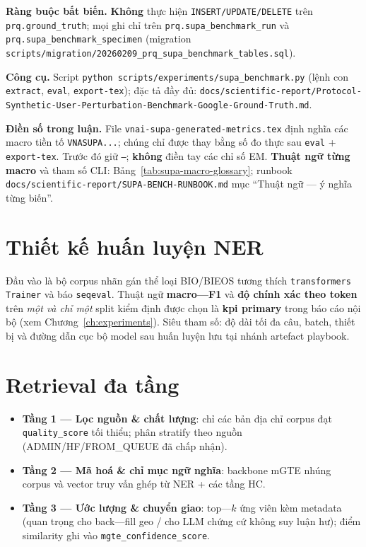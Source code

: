 \textbf{Ràng buộc bất biến.} \textbf{Không} thực hiện \texttt{INSERT/UPDATE/DELETE} trên \texttt{prq.ground\_truth}; mọi ghi chỉ trên \texttt{prq.supa\_benchmark\_run} và \texttt{prq.supa\_benchmark\_specimen} (migration \texttt{scripts/migration/20260209\_prq\_supa\_benchmark\_tables.sql}).

\textbf{Công cụ.} Script \texttt{python scripts/experiments/supa\_benchmark.py} (lệnh con \texttt{extract}, \texttt{eval}, \texttt{export-tex}); đặc tả đầy đủ: \texttt{docs/scientific-report/Protocol-Synthetic-User-Perturbation-Benchmark-Google-Ground-Truth.md}.

\textbf{Điền số trong luận.} File \texttt{vnai-supa-generated-metrics.tex} định nghĩa các macro tiền tố \texttt{VNASUPA...}; chúng chỉ được thay bằng số đo thực sau \texttt{eval} + \texttt{export-tex}. Trước đó giữ \texttt{---}; \textbf{không} điền tay các chỉ số EM. \textbf{Thuật ngữ từng macro} và tham số CLI: Bảng~\ref{tab:supa-macro-glossary}; runbook \texttt{docs/scientific-report/SUPA-BENCH-RUNBOOK.md} mục ``Thuật ngữ --- ý nghĩa từng biến''.

\section{Thiết kế huấn luyện NER}
Đầu vào là bộ corpus nhãn gán thể loại BIO/BIEOS tương thích \texttt{transformers Trainer} và báo \texttt{seqeval}. Thuật ngữ \textbf{macro---F1} và \textbf{độ chính xác theo token} trên \emph{một và chỉ một} split kiểm định được chọn là \textbf{kpi primary} trong báo cáo nội bộ (xem Chương~\ref{ch:experiments}). Siêu tham số: độ dài tối đa câu, batch, thiết bị và đường dẫn cục bộ model sau huấn luyện lưu tại nhánh artefact playbook.

\section{Retrieval đa tầng}
\begin{itemize}
  \item \textbf{Tầng 1 --- Lọc nguồn \& chất lượng}: chỉ các bản địa chỉ corpus đạt \texttt{quality\_score} tối thiểu; phân stratify theo nguồn (ADMIN/HF/FROM\_QUEUE đã chấp nhận).
  \item \textbf{Tầng 2 --- Mã hoá \& chỉ mục ngữ nghĩa}: backbone mGTE nhúng corpus và vector truy vấn ghép từ NER + các tầng HC.
  \item \textbf{Tầng 3 --- Ước lượng \& chuyển giao}: top---\(k\) ứng viên kèm metadata (quan trọng cho back---fill geo / cho LLM chứng cứ không suy luận hư); điểm similarity ghi vào \texttt{mgte\_confidence\_score}.
\end{itemize}

